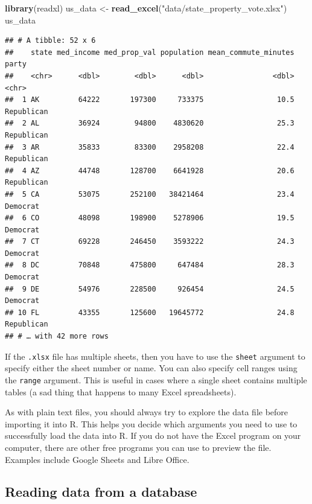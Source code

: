 \documentclass[
]{article}
\newenvironment{Shaded}{\begin{snugshade}}{\end{snugshade}}
\newcommand{\KeywordTok}[1]{\textcolor[rgb]{0.13,0.29,0.53}{\textbf{#1}}}
\newcommand{\NormalTok}[1]{#1}
\newcommand{\StringTok}[1]{\textcolor[rgb]{0.31,0.60,0.02}{#1}}
\begin{document}
\begin{Shaded}
\begin{Highlighting}[]
\KeywordTok{library}\NormalTok{(readxl)}
\NormalTok{us\_data <{-}}\StringTok{ }\KeywordTok{read\_excel}\NormalTok{(}\StringTok{"data/state\_property\_vote.xlsx"}\NormalTok{)}
\NormalTok{us\_data}
\end{Highlighting}
\end{Shaded}

\begin{verbatim}
## # A tibble: 52 x 6
##    state med_income med_prop_val population mean_commute_minutes party     
##    <chr>      <dbl>        <dbl>      <dbl>                <dbl> <chr>     
##  1 AK         64222       197300     733375                 10.5 Republican
##  2 AL         36924        94800    4830620                 25.3 Republican
##  3 AR         35833        83300    2958208                 22.4 Republican
##  4 AZ         44748       128700    6641928                 20.6 Republican
##  5 CA         53075       252100   38421464                 23.4 Democrat  
##  6 CO         48098       198900    5278906                 19.5 Democrat  
##  7 CT         69228       246450    3593222                 24.3 Democrat  
##  8 DC         70848       475800     647484                 28.3 Democrat  
##  9 DE         54976       228500     926454                 24.5 Democrat  
## 10 FL         43355       125600   19645772                 24.8 Republican
## # … with 42 more rows
\end{verbatim}

If the \texttt{.xlsx} file has multiple sheets, then you have to use the
\texttt{sheet} argument to specify either the sheet number or name. You
can also specify cell ranges using the \texttt{range} argument. This is
useful in cases where a single sheet contains multiple tables (a sad
thing that happens to many Excel spreadsheets).

As with plain text files, you should always try to explore the data file
before importing it into R. This helps you decide which arguments you
need to use to successfully load the data into R. If you do not have the
Excel program on your computer, there are other free programs you can
use to preview the file. Examples include Google Sheets and Libre
Office.

\hypertarget{reading-data-from-a-database}{%
\subsection{Reading data from a
database}\label{reading-data-from-a-database}}
\end{document}

